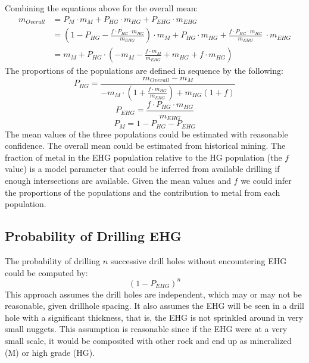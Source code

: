 Combining the equations above for the overall mean:
\begin{align}
    m_{Overall} & = P_{M} \cdot m_{M}  + P_{HG} \cdot m_{HG} + P_{EHG} \cdot m_{EHG} \nonumber                                                                                                  \\
                & = \left(1-P_{HG}-\frac{f \cdot P_{HG} \cdot m_{HG}}{m_{EHG}}\right) \cdot m_{M} + P_{HG} \cdot m_{HG} + \frac{f \cdot P_{HG} \cdot m_{HG}}{m_{EHG}} \ \cdot m_{EHG} \nonumber \\
                & = m_{M} + P_{HG} \cdot \left( -m_{M}-\frac{f \cdot m_{M}}{m_{EHG}}  + m_{HG} + f \cdot m_{HG} \right) \nonumber
\end{align}
The proportions of the populations are defined in sequence by the following:
\[
    P_{HG} =
    \frac{m_{Overall} - m_M}
    {
        -m_M \cdot \left( 1+\frac{f \cdot m_{HG}}{m_{EHG}}\right) + m_{HG}(1+f)
    }
\]
\[
    P_{EHG} = \frac{f \cdot P_{HG} \cdot m_{HG}}{m_{EHG}}
\]
\[
    P_{M} = 1 - P_{HG} - P_{EHG}
\]
The mean values of the three populations could be estimated with reasonable confidence. The overall mean could be estimated from historical mining. The fraction of metal in the \gls{EHG} population relative to the \gls{HG} population (the $f$ value) is a model parameter that could be inferred from available drilling if enough intersections are available. Given the mean values and $f$ we could infer the proportions of the populations and the contribution to metal from each population.

\FloatBarrier
\subsection{Probability of Drilling EHG}
\label{subsec:02probehg}

The probability of drilling $n$ successive drill holes without encountering \gls{EHG} could be computed by:
\[
    \left( 1 - P_{EHG} \right)^n
\]
This approach assumes the drill holes are independent, which may or may not be reasonable, given drillhole spacing. It also assumes the \gls{EHG} will be seen in a drill hole with a significant thickness, that is, the \gls{EHG} is not sprinkled around in very small nuggets. This assumption is reasonable since if the \gls{EHG} were at a very small scale, it would be composited with other rock and end up as mineralized (M) or high grade (HG).

